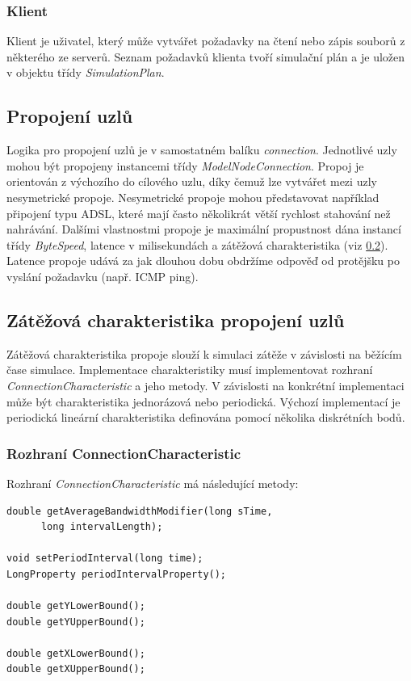 \documentclass[czech,DP]{thesiskiv}
\begin{document}
\subsubsection*{Klient}

Klient je uživatel, který může vytvářet požadavky na čtení nebo zápis souborů z některého ze serverů. Seznam požadavků klienta tvoří simulační plán a je uložen v objektu třídy \textit{SimulationPlan}. 

\subsection{Propojení uzlů} \label{propojeniuzlu}

Logika pro propojení uzlů je v samostatném balíku \textit{connection}. Jednotlivé uzly mohou být propojeny instancemi třídy \textit{ModelNodeConnection}. Propoj je orientován z výchozího do cílového uzlu, díky čemuž lze vytvářet mezi uzly nesymetrické propoje. Nesymetrické propoje mohou představovat například připojení typu ADSL, které mají často několikrát větší rychlost stahování než nahrávání. Dalšími vlastnostmi propoje je maximální propustnost dána instancí třídy  \textit{ByteSpeed}, latence v milisekundách a zátěžová charakteristika (viz \ref{zatezovacharakteristika}). Latence propoje udává za jak dlouhou dobu obdržíme odpověď od protějšku po vyslání požadavku (např. ICMP ping).

\subsection{Zátěžová charakteristika propojení uzlů} \label{zatezovacharakteristika}

Zátěžová charakteristika propoje slouží k simulaci zátěže v závislosti na běžícím čase simulace. Implementace charakteristiky musí implementovat rozhraní \textit{ConnectionCharacteristic} a jeho metody. V závislosti na konkrétní implementaci může být charakteristika jednorázová nebo periodická. Výchozí implementací je periodická lineární charakteristika definována pomocí několika diskrétních bodů.

\subsubsection*{Rozhraní ConnectionCharacteristic}

Rozhraní \textit{ConnectionCharacteristic} má následující metody:

\begin{verbatim}
double getAverageBandwidthModifier(long sTime, 	
      long intervalLength);
    
void setPeriodInterval(long time);
LongProperty periodIntervalProperty();
    
double getYLowerBound();
double getYUpperBound();
    
double getXLowerBound();
double getXUpperBound();
\end{verbatim}
\end{document}
